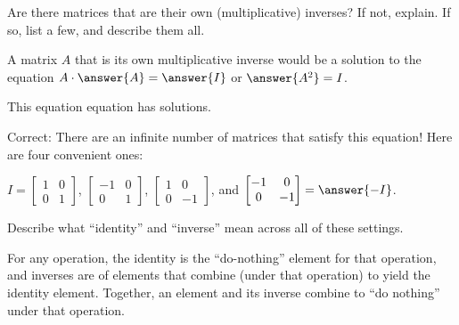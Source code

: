 \documentclass[space,nooutcomes]{ximera}
\begin{document}
\begin{question}
Are there matrices that are their own (multiplicative) inverses?  If not, explain.  If so, list a few, and describe them all.
\begin{solution}
A matrix $A$ that is its own multiplicative inverse would be a solution to the equation $A\cdot \answer{A}=\answer{I}$ or $\answer{A^2}=I$.  

This equation equation has  solutions.   
\begin{feedback}
Correct:  There are an infinite number of matrices that satisfy this equation!
Here are four convenient ones: 

$I=\begin{bmatrix} 1&0 \\ 0&1 \end{bmatrix}$, $\begin{bmatrix} -1&0 \\ 0&1 \end{bmatrix}$, $\begin{bmatrix} 1&0 \\ 0&-1 \end{bmatrix}$, and $\begin{bmatrix} -1&0 \\ 0&-1 \end{bmatrix}=\answer{-I}$. 
\end{feedback}
\end{solution}
\end{question}

\begin{question}
Describe what ``identity'' and ``inverse'' mean across all of these settings.  
\begin{freeResponse}
\begin{hint}
For any operation, the identity is the ``do-nothing'' element for that operation, and inverses are  of elements that combine (under that operation) to yield the identity element. Together, an element and its inverse combine to ``do nothing'' under that operation.  
\end{hint}
\end{freeResponse}
\end{question}
\end{document}
